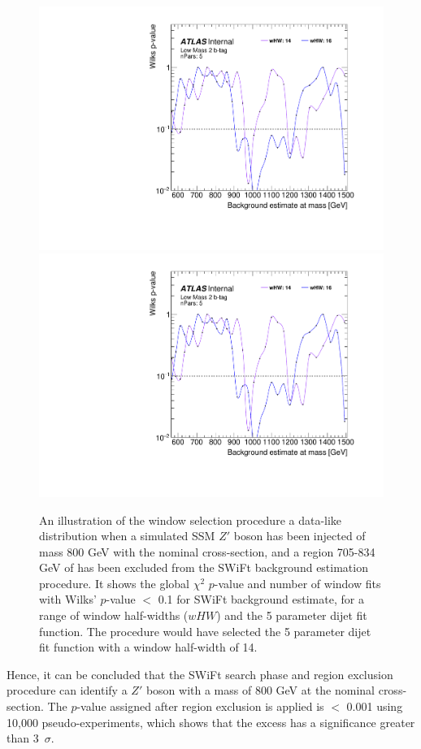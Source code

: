 \begin{figure}[!htb]
\captionsetup[subfigure]{aboveskip=0pt,justification=centering}
\centering
{} {
  \includegraphics[width=0.49\linewidth, angle=0,page=6]{figs/Dibjet/LowMass/FitStudy_min566/windowSel_corrFitCR_dataLike_v11_Zprimebb800_xsFactor1_removeWindow.pdf}
}\hspace{-8mm}
 {
  \includegraphics[width=0.49\linewidth, angle=0,page=8]{figs/Dibjet/LowMass/FitStudy_min566/windowSel_corrFitCR_dataLike_v11_Zprimebb800_xsFactor1_removeWindow.pdf}
}

\caption{\label{fig:windowSel_Zprimebb800_xsFactor1}
  An illustration of the window selection procedure a data-like distribution when
  a simulated SSM $Z'$ boson has been injected of mass 800 GeV with the nominal cross-section,
  and a region 705-834 GeV of has been excluded from the SWiFt background estimation procedure.
  It shows the global $\chi^{2}$ \mbox{$p$-value} %
  and number of window fits with Wilks' \mbox{$p$-value} $<$ 0.1 for SWiFt background estimate,
  for a range of window half-widths ($wHW$) and the 5 parameter dijet fit function.
  The procedure would have selected the 5 parameter dijet fit function with a window half-width of 14.
}
\end{figure}

Hence, it can be concluded that the SWiFt search phase and region exclusion procedure can identify
a $Z'$ boson with a mass of 800 GeV at the nominal cross-section.
The \bh{} $p$-value assigned after region exclusion is applied is $<$ 0.001 using 10,000 pseudo-experiments,
which shows that the excess has a significance greater than 3~$\sigma$.

